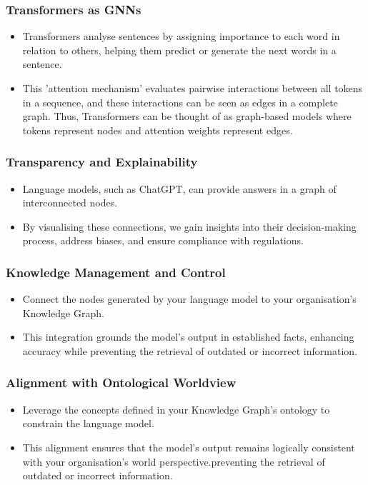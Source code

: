 \begin{frame}[fragile]\frametitle{Transformers as GNNs}

\begin{itemize}
\item Transformers analyse sentences by assigning importance to each word in relation to others, helping them predict or generate the next words in a sentence. 
\item This 'attention mechanism' evaluates pairwise interactions between all tokens in a sequence, and these interactions can be seen as edges in a complete graph. Thus, Transformers can be thought of as graph-based models where tokens represent nodes and attention weights represent edges.
\end{itemize}
	  
\end{frame}


\begin{frame}[fragile]\frametitle{Transparency and Explainability}

\begin{itemize}
\item  Language models, such as ChatGPT, can provide answers in a graph of interconnected nodes. 
\item By visualising these connections, we gain insights into their decision-making process, address biases, and ensure compliance with regulations.
\end{itemize}
	  
\end{frame}

\begin{frame}[fragile]\frametitle{Knowledge Management and Control}

\begin{itemize}
\item Connect the nodes generated by your language model to your organisation's Knowledge Graph. 
\item This integration grounds the model's output in established facts, enhancing accuracy while preventing the retrieval of outdated or incorrect information.
\end{itemize}
	  
\end{frame}

\begin{frame}[fragile]\frametitle{Alignment with Ontological Worldview}

\begin{itemize}
\item Leverage the concepts defined in your Knowledge Graph's ontology to constrain the language model. 
\item This alignment ensures that the model's output remains logically consistent with your organisation's world perspective.preventing the retrieval of outdated or incorrect information.
\end{itemize}
	  
\end{frame}

